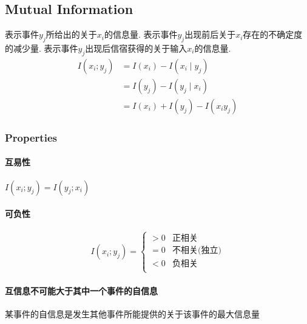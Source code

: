 \documentclass[a4paper]{report}
\begin{document}
\subsection{Mutual Information}
表示事件$y_j$所给出的关于$x_i$的信息量. 
表示事件$y_j$出现前后关于$x_i$存在的不确定度的减少量. 
表示事件$y_j$出现后信宿获得的关于输入$x_i$的信息量. 
\begin{align}
  I(x_i;y_j)&=I(x_i)-I(x_i\mid y_j)
  \\ &=I(y_j)-I(y_j\mid x_i)
  \\ &=I(x_i)+I(y_j)-I(x_i y_j)
\end{align}
\subsubsection{Properties}
\paragraph{互易性}
$I(x_i;y_j)=I(y_j;x_i)$
\paragraph{可负性}
$$I(x_i;y_j)=\begin{cases}
  >0 &\text{正相关}\\
  =0 &\text{不相关(独立)}\\
  <0 &\text{负相关}\\
\end{cases}$$
\paragraph{互信息不可能大于其中一个事件的自信息}某事件的自信息是发生其他事件所能提供的关于该事件的最大信息量
\end{document}
